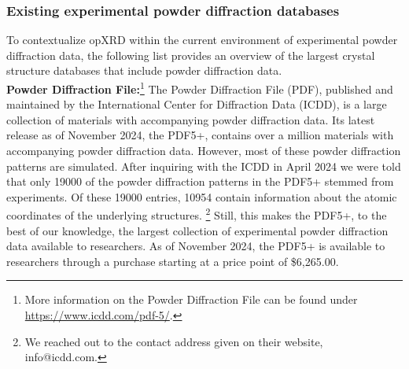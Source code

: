 

\pagebreak

\subsubsection*{Existing experimental powder diffraction databases}
To contextualize opXRD within the current environment of experimental powder diffraction data, the following list provides an overview of the largest crystal structure databases that include powder diffraction data.  \\

\textbf{Powder Diffraction File:}\footnote{More information on the Powder Diffraction File can be found under \url{https://www.icdd.com/pdf-5/}.} The Powder Diffraction File (PDF), published and maintained by the International Center for Diffraction Data (ICDD), is a large collection of materials with accompanying powder diffraction data. Its latest release as of November 2024, the PDF5+, contains over a million materials with accompanying powder diffraction data. However, most of these powder diffraction patterns are simulated. After inquiring with the ICDD in April 2024 we were told that only 19000 of the powder diffraction patterns in the PDF5+ stemmed from experiments. Of these 19000 entries, 10954 contain information about the atomic coordinates of the underlying structures. \footnote{We reached out to the contact address given on their website, info@icdd.com.} Still, this makes the PDF5+, to the best of our knowledge, the largest collection of experimental powder diffraction data available to researchers. As of November 2024, the PDF5+ is available to researchers through a purchase starting at a price point of \$6,265.00.\\

